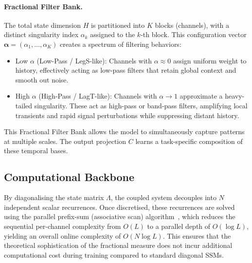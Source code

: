 \documentclass{article}
\theoremstyle{plain}
\theoremstyle{definition}
\theoremstyle{remark}
\begin{document}
\paragraph{Fractional Filter Bank.}
The total state dimension $H$ is partitioned into $K$ blocks (channels), with a distinct singularity index $\alpha_k$ assigned to the $k$-th block. This configuration vector $\boldsymbol{\alpha} = (\alpha_1, \ldots, \alpha_K)$ creates a spectrum of filtering behaviors:
\begin{itemize}
	\item Low $\alpha$ (Low-Pass / LegS-like): Channels with $\alpha \approx 0$ assign uniform weight to history, effectively acting as low-pass filters that retain global context and smooth out noise.
	\item High $\alpha$ (High-Pass / LagT-like): Channels with $\alpha \to 1$ approximate a heavy-tailed singularity. These act as high-pass or band-pass filters, amplifying local transients and rapid signal perturbations while suppressing distant history.
\end{itemize}
This Fractional Filter Bank allows the model to simultaneously capture patterns at multiple scales. The output projection $C$ learns a task-specific composition of these temporal bases.



\subsection{Computational Backbone}
\label{subsec:computation}

By diagonalising the state matrix $\Lambda$, the coupled system decouples into $N$ independent scalar recurrences. Once discretised, these recurrences are solved using the parallel prefix-sum (associative scan) algorithm~\citep{blelloch1990prefix}, which reduces the sequential per-channel complexity from $O(L)$ to a parallel depth of $O(\log L)$, yielding an overall online complexity of $O(N \log L)$. This ensures that the theoretical sophistication of the fractional measure does not incur additional computational cost during training compared to standard diagonal SSMs.
\end{document}
